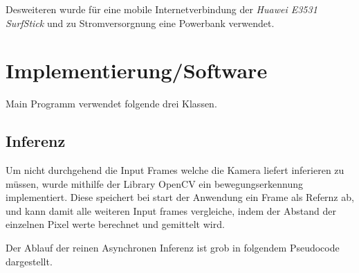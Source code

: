 Desweiteren wurde für eine mobile Internetverbindung 
der \textit{Huawei E3531 SurfStick} und zu Stromversorgnung
eine Powerbank verwendet.




\section{Implementierung/Software}

Main Programm verwendet folgende drei Klassen.

% 

%         
%     
%     


%


\vspace{1cm}






\subsection*{Inferenz}


Um nicht durchgehend die Input Frames welche die Kamera liefert inferieren zu 
müssen, wurde mithilfe der Library OpenCV ein bewegungserkennung 
implementiert. Diese speichert bei start der Anwendung ein Frame 
als Refernz ab, und kann damit alle weiteren Input frames vergleiche, 
indem der Abstand der einzelnen Pixel werte berechnet und gemittelt wird.

Der Ablauf der reinen Asynchronen Inferenz ist grob in 
folgendem Pseudocode dargestellt. 



